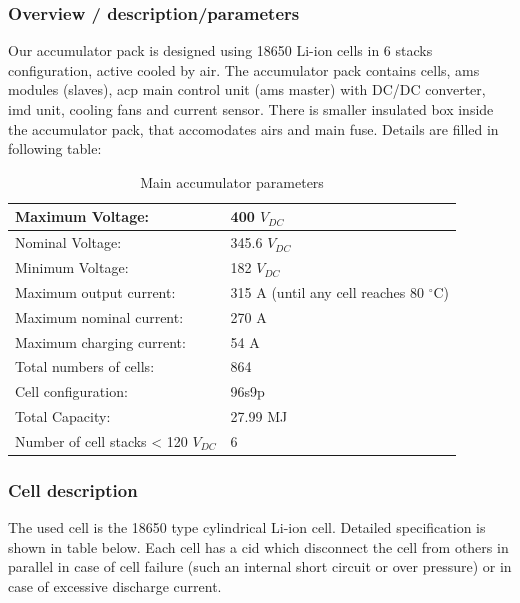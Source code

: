 \subsubsection{Overview / description/parameters}
Our accumulator pack is designed using 18650 Li-ion cells in 6 stacks configuration, active cooled by air. The accumulator pack contains cells, \gls{ams} modules (slaves), \gls{acp} main control unit (\gls{ams} master) with DC/DC converter, \gls{imd} unit, cooling fans and current sensor. There is smaller insulated box inside the accumulator pack, that accomodates \glspl{air} and main fuse.
Details are filled in following table:

\begin{table}[H]
	\centering
	\caption{Main accumulator parameters}
	\begin{tabu}{|X|X|}
		\hline
		Maximum Voltage: & 400 $V_{DC}$ \\
		\hline
		Nominal Voltage: & 345.6 $V_{DC}$ \\
		\hline
		Minimum Voltage: & 182 $V_{DC}$ \\
		\hline
		Maximum output current: & 315 A (until any cell reaches 80 $^\circ$C) \\
		\hline
		Maximum nominal current: & 270 A \\
		\hline
		Maximum charging current: & 54 A \\
		\hline
		Total numbers of cells: & 864 \\
		\hline
		Cell configuration: & 96s9p \\
		\hline
		Total Capacity: & 27.99 MJ \\
		\hline
		Number of cell stacks < 120 $V_{DC}$ & 6 \\
		\hline
	\end{tabu}%
	\label{tab:acc-main}%
\end{table}%

\subsubsection{Cell description}

The used cell is the 18650 type cylindrical Li-ion cell. Detailed specification is shown in table below. Each cell has a \gls{cid} which disconnect the cell from others in parallel in case of cell failure (such an internal short circuit or over pressure) or in case of excessive discharge current. 


